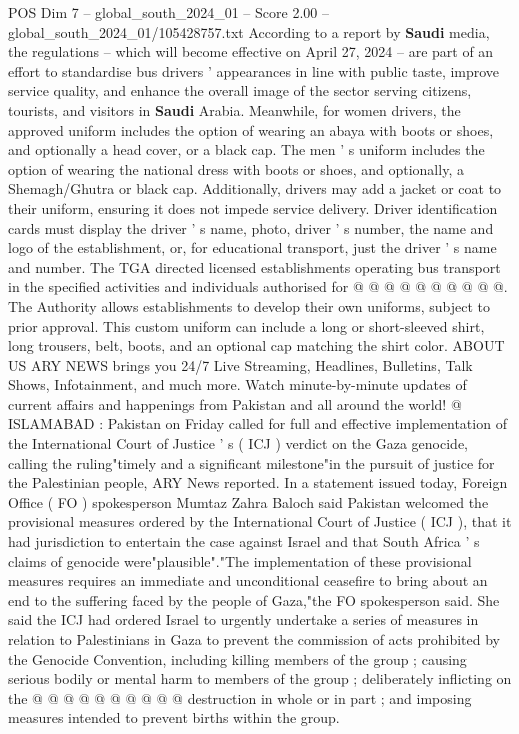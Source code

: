 \begin{textsample}{POS Dim 7 – global\_south\_2024\_01 – Score 2.00 – global\_south\_2024\_01/105428757.txt}  \label{ex:f7_pos_048}
According to a report by \textbf{Saudi} media, the regulations -- which will become effective on April 27, 2024 -- are part of an effort to standardise bus drivers ' appearances in line with public taste, improve service quality, and enhance the overall image of the sector serving citizens, tourists, and visitors in \textbf{Saudi} Arabia.
Meanwhile, for women drivers, the approved uniform includes the option of wearing an abaya with boots or shoes, and optionally a head cover, or a black cap.
The men ' s uniform includes the option of wearing the national dress with boots or shoes, and optionally, a Shemagh/Ghutra or black cap.
Additionally, drivers may add a jacket or coat to their uniform, ensuring it does not impede service delivery.
Driver identification cards must display the driver ' s name, photo, driver ' s number, the name and logo of the establishment, or, for educational transport, just the driver ' s name and number.
The TGA directed licensed establishments operating bus transport in the specified activities and individuals authorised for @ @ @ @ @ @ @ @ @ @.
The Authority allows establishments to develop their own uniforms, subject to prior approval.
This custom uniform can include a long or short-sleeved shirt, long trousers, belt, boots, and an optional cap matching the shirt color.
ABOUT US ARY NEWS brings you 24/7 Live Streaming, Headlines, Bulletins, Talk Shows, Infotainment, and much more.
Watch minute-by-minute updates of current affairs and happenings from Pakistan and all around the world! @ ISLAMABAD : Pakistan on Friday called for full and effective implementation of the International Court of Justice ' s ( ICJ ) verdict on the Gaza genocide, calling the ruling"timely and a significant milestone"in the pursuit of justice for the Palestinian people, ARY News reported.
In a statement issued today, Foreign Office ( FO ) spokesperson Mumtaz Zahra Baloch said Pakistan welcomed the provisional measures ordered by the International Court of Justice ( ICJ ), that it had jurisdiction to entertain the case against Israel and that South Africa ' s claims of genocide were"plausible"."The implementation of these provisional measures requires an immediate and unconditional ceasefire to bring about an end to the suffering faced by the people of Gaza,"the FO spokesperson said.
She said the ICJ had ordered Israel to urgently undertake a series of measures in relation to Palestinians in Gaza to prevent the commission of acts prohibited by the Genocide Convention, including killing members of the group ; causing serious bodily or mental harm to members of the group ; deliberately inflicting on the @ @ @ @ @ @ @ @ @ @ destruction in whole or in part ; and imposing measures intended to prevent births within the group.

\end{textsample}

